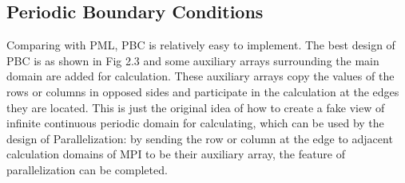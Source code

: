 \subsection{Periodic Boundary Conditions}
Comparing with PML, PBC is relatively easy to implement.  The best design of PBC is as shown in Fig 2.3 and some
auxiliary arrays surrounding the main domain are added for calculation. These auxiliary arrays copy the values of the
rows or columns in opposed sides and participate in the calculation at the edges they are located. This is just the
original idea of how to create a fake view of infinite continuous periodic domain for calculating, which can be used by
the design of Parallelization: by sending the row or column at the edge to adjacent calculation domains of MPI to be
their auxiliary array, the feature of parallelization can be completed.

